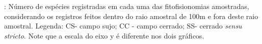 \label{fig:aves3}: Número de espécies registradas em cada uma das fitofisionomias amostradas, considerando os 
registros feitos dentro do raio amostral de 100m e fora deste raio amostral. 
Legenda: CS- campo sujo; CC -  campo cerrado; SS- cerrado \textit{sensu stricto}. 
Note que a escala do eixo y é diferente nos dois gráficos.


